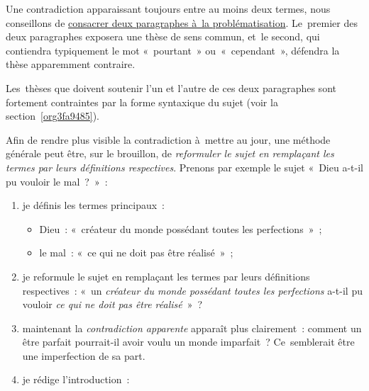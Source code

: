 \documentclass[a4paper,12pt]{report}
\begin{document}
Une contradiction apparaissant toujours entre au moins deux termes, nous
conseillons de \uline{consacrer deux paragraphes à la problématisation}.
Le premier des deux paragraphes exposera une thèse de sens commun, et le
second, qui contiendra typiquement le mot « pourtant » ou « cependant »,
défendra la thèse apparemment contraire.

Les thèses que doivent soutenir l'un et l'autre de ces deux paragraphes
sont fortement contraintes par la forme syntaxique du sujet (voir la
section \ref{org3fa9485}).

Afin de rendre plus visible la contradiction à mettre au jour, une
méthode générale peut être, sur le brouillon, de \emph{reformuler le sujet en
remplaçant les termes par leurs définitions respectives}. Prenons par
exemple le sujet « Dieu a-t-il pu vouloir le mal ? » :

\begin{enumerate}
\item je définis les termes principaux :
\begin{itemize}
\item Dieu : « créateur du monde possédant toutes les perfections » ;
\item le mal : « ce qui ne doit pas être réalisé » ;
\end{itemize}

\item je reformule le sujet en remplaçant les termes par leurs définitions
respectives : « un \emph{créateur du monde possédant toutes les
perfections} a-t-il pu vouloir \emph{ce qui ne doit pas être réalisé} » ?

\item maintenant la \emph{contradiction apparente} apparaît plus clairement :
comment un être parfait pourrait-il avoir voulu un monde imparfait ?
Ce semblerait être une imperfection de sa part.

\item je rédige l'introduction :
\end{enumerate}
\end{document}
